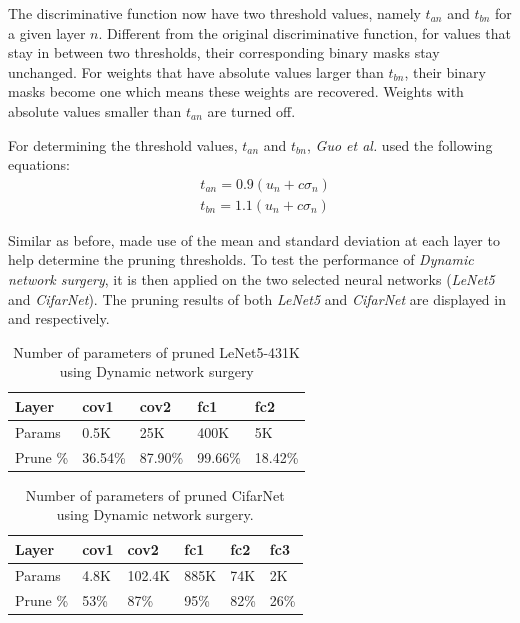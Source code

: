 \documentclass[a4paper,12pt]{report}
\begin{document}
The discriminative function now have two threshold values, namely $t_{an}$ and
$t_{bn}$ for a given layer $n$.
Different from the original discriminative function, for values that stay in
between two thresholds, their corresponding binary masks stay unchanged.
For weights that have absolute values larger than $t_{bn}$, their binary masks
become one which means these weights are recovered.
Weights with absolute values smaller than $t_{an}$ are turned off.

For determining the threshold values, $t_{an}$ and $t_{bn}$,
\textit{Guo et al.} used the following equations:
\begin{equation}
  \begin{aligned}
  &t_{an} = 0.9 (u_n + c \sigma_n) \\
  &t_{bn} = 1.1 (u_n + c \sigma_n)
  \label{equ:hfunc_ds}
  \end{aligned}
\end{equation}

Similar as before,  made use of the mean and standard deviation
at each layer to help determine the pruning thresholds.
To test the performance of \textit{Dynamic network surgery}, it is
then applied on the two selected neural networks (\textit{LeNet5} and \textit{CifarNet}).
The pruning results of both \textit{LeNet5} and \textit{CifarNet} are displayed
in  and  respectively.

\begin{table}[!h]
\centering
\begin{tabular}{|l|l|l|l|l|}
\hline
Layer			&cov1	&cov2	&fc1	&fc2 		\\ \hline
Params		& 0.5K		&25K	&400K	&5K		\\
\hline
Prune \%	& 36.54\%		&87.90\%	&99.66\%	&18.42\%	 \\
\hline
\end{tabular}
\caption{Number of parameters of pruned LeNet5-431K using Dynamic network surgery}
\label{tab:LeNetPrune3}
\end{table}

\begin{table}[!h]
\centering
\begin{tabular}{|l|l|l|l|l|l|}
\hline
Layer			&cov1	&cov2		&fc1		&fc2		&fc3		\\ \hline
Params		& 4.8K		&102.4K	&885K	&74K		&2K 	\\
\hline
Prune \%	& 53\%		&87\%	&95\%	&82\%	&26\% \\
\hline
\end{tabular}
\caption{Number of parameters of pruned CifarNet using Dynamic network surgery.}
\label{tab:CifarNetPrune2}
\end{table}
\end{document}

